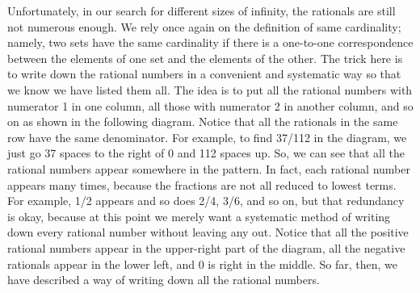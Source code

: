 Unfortunately, in our search for different sizes of infinity, the rationals are still not numerous enough. We rely once again on the definition of same cardinality; namely, two sets have the same cardinality if there is a one-to-one correspondence between the elements of one set and the elements of the other. The trick here is to write down the rational numbers in a convenient and systematic way so that we know we have listed them all. The idea is to put all the rational numbers with numerator 1 in one column, all those with numerator 2 in another column, and so on as shown in the following diagram. Notice that all the rationals in the same row have the same denominator. For example, to find 37/112 in the diagram, we just go 37 spaces to the right of 0 and 112 spaces up. So, we can see that all the rational numbers appear somewhere in the pattern. In fact, each rational number appears many times, because the fractions are not all reduced to lowest terms. For example, 1/2 appears and so does 2/4, 3/6, and so on, but that redundancy is okay, because at this point we merely want a systematic method of writing down every rational number without leaving any out. Notice that all the positive rational numbers appear in the upper-right part of the diagram, all the negative rationals appear in the lower left, and 0 is right in the middle. So far, then, we have described a way of writing down all the rational numbers.

